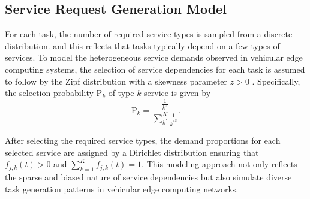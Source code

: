 \documentclass[lettersize,journal]{IEEEtran}
\begin{document}
\subsection{Service Request Generation Model}
For each task, the number of required service types is sampled from a discrete distribution. 
and this reflects  that  tasks typically depend on  a few types of services. 
To model the heterogeneous service demands observed in vehicular edge computing systems, the selection of service dependencies for each task is assumed to follow by the Zipf distribution with a skewness parameter $ z>0 $ \cite{YuWu-35}. 
Specifically, the selection probability $ \mathrm{P}_{k} $  of type-$ k$ service is given by
\begin{equation}
	\label{equ: zipf}
	\mathrm{P}_{k} = \frac{\frac{1}{k^{z}}}{\sum_{k^{\prime}}^{K}{\frac{1}{{k^{\prime}}^{z}}}}.
\end{equation}

After selecting the required service types, the demand proportions for each selected service 
are assigned by a Dirichlet distribution ensuring that $ f_{j,k}(t)>0 $ and $ \sum_{k=1}^{K}{f_{j,k}(t)=1} $.
This modeling approach not only reflects the sparse and biased nature of service dependencies but also simulate  diverse task generation patterns in vehicular edge computing networks.
\end{document}
